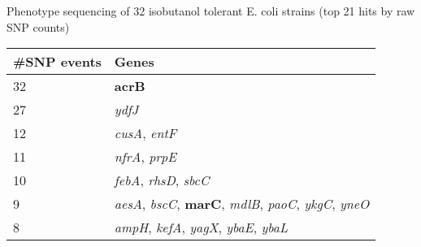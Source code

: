 \documentclass[letterpaper,10pt,english]{howto}
\begin{document}
\begin{threeparttable}
\caption{Phenotype sequencing of 32 isobutanol tolerant E. coli strains (top 21 hits by raw SNP counts)}

\begin{tabulary}{\textwidth}{|L|L|}
\hline
\textbf{
\#SNP events
} & \textbf{
Genes
}\\
\hline

32
 & 
\textbf{acrB}
\\

27
 & 
\emph{ydfJ}
\\

12
 & 
\emph{cusA}, \emph{entF}
\\

11
 & 
\emph{nfrA}, \emph{prpE}
\\

10
 & 
\emph{febA}, \emph{rhsD}, \emph{sbcC}
\\

9
 & 
\emph{aesA}, \emph{bscC}, \textbf{marC}, \emph{mdlB}, \emph{paoC}, \emph{ykgC}, \emph{yneO}
\\

8
 & 
\emph{ampH}, \emph{kefA}, \emph{yagX}, \emph{ybaE}, \emph{ybaL}
\\
\hline
\end{tabulary}

\end{threeparttable}
\end{document}

